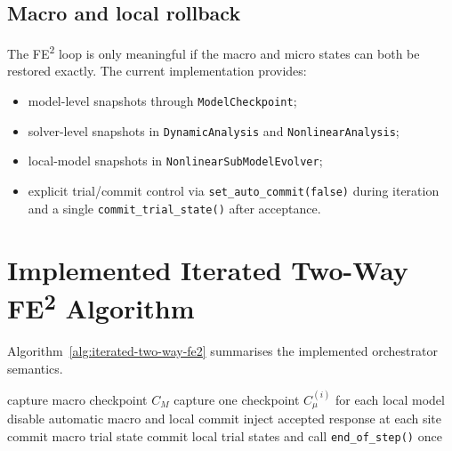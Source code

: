 \subsection{Macro and local rollback}

The FE\textsuperscript{2} loop is only meaningful if the macro and micro
states can both be restored exactly.  The current implementation provides:
\begin{itemize}
  \item model-level snapshots through \texttt{ModelCheckpoint};
  \item solver-level snapshots in \texttt{DynamicAnalysis} and
    \texttt{NonlinearAnalysis};
  \item local-model snapshots in \texttt{NonlinearSubModelEvolver};
  \item explicit trial/commit control via \texttt{set\_auto\_commit(false)}
    during iteration and a single \texttt{commit\_trial\_state()} after
    acceptance.
\end{itemize}

\section{Implemented Iterated Two-Way FE\textsuperscript{2} Algorithm}
\label{sec:ms-pub-algorithm}

Algorithm~\ref{alg:iterated-two-way-fe2} summarises the implemented
orchestrator semantics.

\begin{algorithm}[htb]
\DontPrintSemicolon
\caption{Implemented \texttt{IteratedTwoWayFE2} protocol}
\label{alg:iterated-two-way-fe2}
\BlankLine
capture macro checkpoint \(C_M\)\;
capture one checkpoint \(C_\mu^{(i)}\) for each local model\;
disable automatic macro and local commit\;
inject accepted response at each site\;
commit macro trial state\;
commit local trial states and call \texttt{end\_of\_step()} once\;
\end{algorithm}

